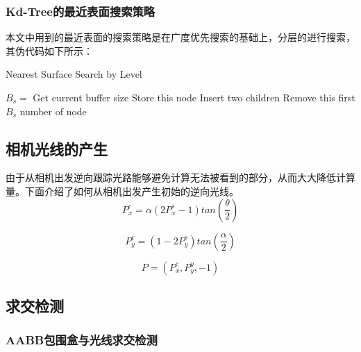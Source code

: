 \documentclass[10pt]{article}
\begin{document}
\subsubsection{Kd-Tree的最近表面搜索策略}
本文中用到的最近表面的搜索策略是在广度优先搜索的基础上，分层的进行搜索，其伪代码如下所示：
\begin{algorithm}[!h]
	\caption{Nearest Surface Search by Level}%
	\begin{algorithmic}[1]%
		\STATE $B_s =$ Get current buffer size
		\STATE Store this node
		\ENDIF		
		\ELSE
		\STATE Insert two children
		\ENDIF
		\STATE Remove this first $B_s$ number of node
		\ENDFOR
	\end{algorithmic}
\end{algorithm}



\subsection{相机光线的产生}
由于从相机出发逆向跟踪光路能够避免计算无法被看到的部分，从而大大降低计算量。下面介绍了如何从相机出发产生初始的逆向光线。
$$P_x^{c}=\alpha(2P_x^{s}-1) tan(\frac{\theta}{2})$$

$$P_y^{c}=(1-2P_y^{s})tan(\frac{\alpha}{2})$$

$$P=(P_x^{c},P_y^{y},-1)$$
\subsection{求交检测}
\subsubsection{AABB包围盒与光线求交检测}
\end{document}
